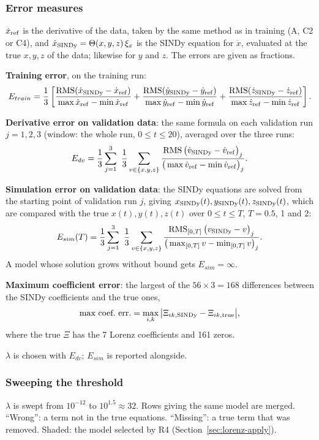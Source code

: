\documentclass[11pt,a4paper]{article}
\newcommand{\RMS}{\operatorname{RMS}}
\begin{document}
\subsubsection{Error measures}\label{sec:lorenz-err}
$\dot x_{\rm ref}$ is the derivative of the data, taken by the same method as in training (A, C2 or C4), and $\dot x_{\rm SINDy}=\Theta(x,y,z)\,\xi_x$ is the SINDy equation for $\dot x$, evaluated at the true $x,y,z$ of the data; likewise for $y$ and $z$. The errors are given as fractions.

\textbf{Training error}, on the training run:
\[
  E_{train} = \frac13\left[
  \frac{\RMS(\dot x_{\rm SINDy}-\dot x_{\rm ref})}{\max\dot x_{\rm ref}-\min\dot x_{\rm ref}} +
  \frac{\RMS(\dot y_{\rm SINDy}-\dot y_{\rm ref})}{\max\dot y_{\rm ref}-\min\dot y_{\rm ref}} +
  \frac{\RMS(\dot z_{\rm SINDy}-\dot z_{\rm ref})}{\max\dot z_{\rm ref}-\min\dot z_{\rm ref}}\right].
\]

\textbf{Derivative error on validation data}: the same formula on each validation run $j=1,2,3$ (window: the whole run, $0\le t\le20$), averaged over the three runs:
\[
  E_{dv} = \frac13\sum_{j=1}^{3}\ \frac13\sum_{v\in\{x,y,z\}}
  \frac{\RMS\big(\dot v_{\rm SINDy}-\dot v_{\rm ref}\big)_j}{\big(\max \dot v_{\rm ref}-\min\dot v_{\rm ref}\big)_j}.
\]

\textbf{Simulation error on validation data}: the SINDy equations are solved from the starting point of validation run $j$, giving $x_{\rm SINDy}(t), y_{\rm SINDy}(t), z_{\rm SINDy}(t)$, which are compared with the true $x(t),y(t),z(t)$ over $0\le t\le T$, $T=0.5$, 1 and 2:
\[
  E_{sim}(T) = \frac13\sum_{j=1}^{3}\ \frac13\sum_{v\in\{x,y,z\}}
  \frac{\RMS_{[0,T]}\big(v_{\rm SINDy}-v\big)_j}{\big(\max_{[0,T]} v-\min_{[0,T]} v\big)_j}.
\]
A model whose solution grows without bound gets $E_{sim}=\infty$.

\textbf{Maximum coefficient error}: the largest of the $56\times3=168$ differences between the SINDy coefficients and the true ones,
\[
  \text{max coef.\ err.} = \max_{i,k} \big|\Xi_{ik,\rm SINDy}-\Xi_{ik,\rm true}\big| ,
\]
where the true $\Xi$ has the 7 Lorenz coefficients and 161 zeros.

$\lambda$ is chosen with $E_{dv}$; $E_{sim}$ is reported alongside.

\subsubsection{Sweeping the threshold}
$\lambda$ is swept from $10^{-12}$ to $10^{1.5}\approx 32$. Rows giving the same model are merged. ``Wrong'': a term not in the true equations. ``Missing'': a true term that was removed. Shaded: the model selected by R4 (Section~\ref{sec:lorenz-apply}).
\end{document}
